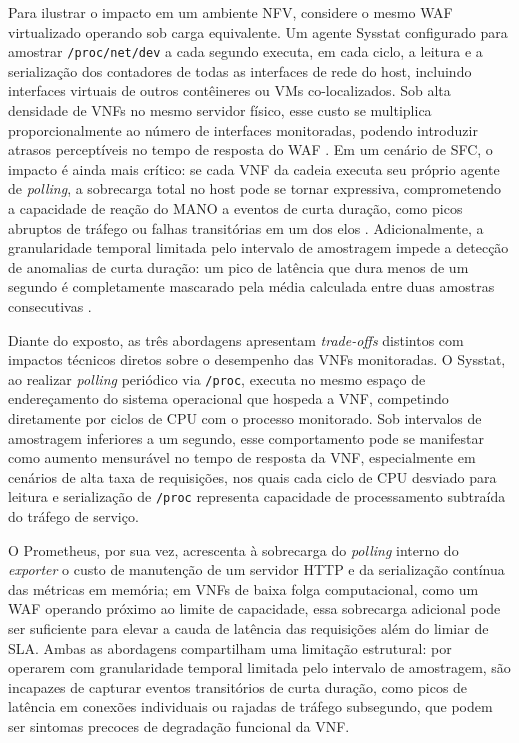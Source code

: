 Para ilustrar o impacto em um ambiente NFV, considere o mesmo WAF virtualizado operando sob carga equivalente. Um agente Sysstat configurado para amostrar \texttt{/proc/net/dev} a cada segundo executa, em cada ciclo, a leitura e a serialização dos contadores de todas as interfaces de rede do host, incluindo interfaces virtuais de outros contêineres ou VMs co-localizados. Sob alta densidade de VNFs no mesmo servidor físico, esse custo se multiplica proporcionalmente ao número de interfaces monitoradas, podendo introduzir atrasos perceptíveis no tempo de resposta do WAF \cite{10.1145/3452296.3472888}. Em um cenário de SFC, o impacto é ainda mais crítico: se cada VNF da cadeia executa seu próprio agente de \textit{polling}, a sobrecarga total no host pode se tornar expressiva, comprometendo a capacidade de reação do MANO a eventos de curta duração, como picos abruptos de tráfego ou falhas transitórias em um dos elos \cite{oliveira_observability_2026, 10.23919}. Adicionalmente, a granularidade temporal limitada pelo intervalo de amostragem impede a detecção de anomalias de curta duração: um pico de latência que dura menos de um segundo é completamente mascarado pela média calculada entre duas amostras consecutivas \cite{epping2024rtt}.

Diante do exposto, as três abordagens apresentam \textit{trade-offs} distintos com impactos técnicos diretos sobre o desempenho das VNFs monitoradas. O Sysstat, ao realizar \textit{polling} periódico via \texttt{/proc}, executa no mesmo espaço de endereçamento do sistema operacional que hospeda a VNF, competindo diretamente por ciclos de CPU com o processo monitorado. Sob intervalos de amostragem inferiores a um segundo, esse comportamento pode se manifestar como aumento mensurável no tempo de resposta da VNF, especialmente em cenários de alta taxa de requisições, nos quais cada ciclo de CPU desviado para leitura e serialização de \texttt{/proc} representa capacidade de processamento subtraída do tráfego de serviço.

O Prometheus, por sua vez, acrescenta à sobrecarga do \textit{polling} interno do \textit{exporter} o custo de manutenção de um servidor HTTP e da serialização contínua das métricas em memória; em VNFs de baixa folga computacional, como um WAF operando próximo ao limite de capacidade, essa sobrecarga adicional pode ser suficiente para elevar a cauda de latência das requisições além do limiar de SLA. Ambas as abordagens compartilham uma limitação estrutural: por operarem com granularidade temporal limitada pelo intervalo de amostragem, são incapazes de capturar eventos transitórios de curta duração, como picos de latência em conexões individuais ou rajadas de tráfego subsegundo, que podem ser sintomas precoces de degradação funcional da VNF.


